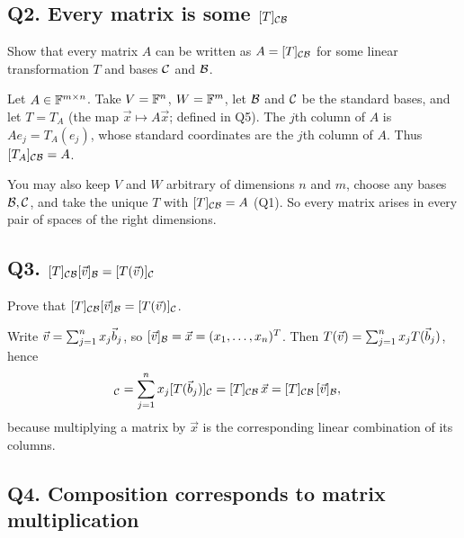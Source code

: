 \subsection{Q2. Every matrix is some $[T]_{\mathcal{C}\mathcal{B}}$}

\begin{promptbox}
Show that every matrix $A$ can be written as $A=[T]_{\mathcal{C}\mathcal{B}}$ for some linear
transformation $T$ and bases $\mathcal{C}$ and $\mathcal{B}$.
\end{promptbox}

\begin{coursebox}
Let $A\in\mathbb{F}^{m\times n}$. Take $V=\mathbb{F}^n$, $W=\mathbb{F}^m$, let $\mathcal{B}$ and $\mathcal{C}$ be the
standard bases, and let $T=T_A$ (the map $\vec{x}\mapsto A\vec{x}$; defined in
Q5). The $j$th column of $A$ is $A e_j=T_A(e_j)$, whose standard coordinates are
the $j$th column of $A$. Thus $[T_A]_{\mathcal{C}\mathcal{B}}=A$.
\end{coursebox}

\begin{laterbox}
You may also keep $V$ and $W$ arbitrary of dimensions $n$ and $m$, choose any
bases $\mathcal{B},\mathcal{C}$, and take the unique $T$ with $[T]_{\mathcal{C}\mathcal{B}}=A$ (Q1). So every
matrix arises in every pair of spaces of the right dimensions.
\end{laterbox}

\subsection{Q3. $[T]_{\mathcal{C}\mathcal{B}}[\vec{v}]_{\mathcal{B}}=[T(\vec{v})]_{\mathcal{C}}$}

\begin{promptbox}
Prove that $[T]_{\mathcal{C}\mathcal{B}}[\vec{v}]_{\mathcal{B}}=[T(\vec{v})]_{\mathcal{C}}$.
\end{promptbox}

\begin{coursebox}
Write $\vec{v}=\sum_{j=1}^n x_j\vec{b}_j$, so $[\vec{v}]_{\mathcal{B}}=\vec{x}=(x_1,\ldots,x_n)^T$.
Then $T(\vec{v})=\sum_{j=1}^n x_j T(\vec{b}_j)$, hence
\begin{align*}
[T(\vv)]_{\cC}
&=\sum_{j=1}^n x_j [T(\bb_j)]_{\cC}
=[T]_{\cC\cB}\,\vec{x}
=[T]_{\cC\cB}\,[\vv]_{\cB},
\end{align*}
because multiplying a matrix by $\vec{x}$ is the corresponding linear combination
of its columns.
\end{coursebox}

\subsection{Q4. Composition corresponds to matrix multiplication}

